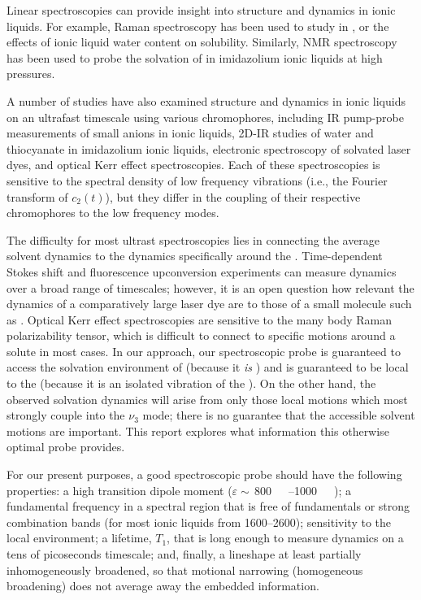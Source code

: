 \documentclass[%
  class = book,%
  crop = false,%
  float = true,%
  multi = true,%
  preview = false,%
]{standalone}
\let\cite\autocite
\begin{document}
Linear spectroscopies can provide insight into structure and dynamics in ionic liquids. For example, Raman spectroscopy has been used to study  in \ce{[Im_{4,1}][TFA]},\cite{Cabaco2011} or the effects of ionic liquid water content on  solubility.\cite{Romanos2013} Similarly, NMR spectroscopy has been used to probe the solvation of  in imidazolium ionic liquids at high pressures.\cite{Corvo2013,Carvalho2009}

A number of studies have also examined structure and dynamics in ionic liquids on an ultrafast timescale using various chromophores, including IR pump-probe measurements of small anions in ionic liquids,\cite{dahlJCP-05} 2D-IR studies of water\cite{wongJPCB-13} and thiocyanate\cite{Ren2014} in imidazolium ionic liquids, electronic spectroscopy of solvated laser dyes,\cite{Maroncelli2012,zhangJPCB-12} and optical Kerr effect spectroscopies.\cite{turtonJACS-09,xiaoJPCB-09,bardakCPC-12,Turton2012} Each of these spectroscopies is sensitive  to the spectral density of low frequency vibrations (i.e., the Fourier transform of \(c_2(t)\)), but they differ in the coupling of their respective chromophores to the low frequency modes.

The difficulty for most ultrast spectroscopies lies in connecting the average solvent dynamics to the dynamics specifically around the . Time-dependent Stokes shift and fluorescence upconversion experiments\cite{zhangJPCB-12} can measure dynamics over a broad range of timescales; however, it is an open question how relevant the dynamics of a comparatively large laser dye are to those of a small molecule such as . Optical Kerr effect spectroscopies\cite{turtonJACS-09,castnerACR-07} are sensitive to the many body Raman polarizability tensor, which is difficult to connect to specific motions around a solute in most cases. In our approach, our spectroscopic probe is guaranteed to access the solvation environment of  (because it \emph{is} ) and is guaranteed to be local to the  (because it is an isolated vibration of the ). On the other hand, the observed solvation dynamics will arise from only those local motions which most strongly couple into the \(\nu_3\) mode; there is no guarantee that the accessible solvent motions are important. This report explores what information this otherwise optimal probe provides.

For our present purposes, a good spectroscopic probe should have the following properties: a high transition dipole moment (\(\varepsilon \sim\,\)\SIrange{800}{1000}{\per\Molar\wavenumber}); a fundamental frequency in a spectral region that is free of fundamentals or strong combination bands (for most ionic liquids from \SIrange{1600}{2600}{\wavenumber}); sensitivity to the local environment; a lifetime, \(T_1\), that is long enough to measure dynamics on a tens of picoseconds timescale; and, finally, a lineshape at least partially inhomogeneously broadened, so that motional narrowing (homogeneous broadening) does not average away the embedded information.
\end{document}
